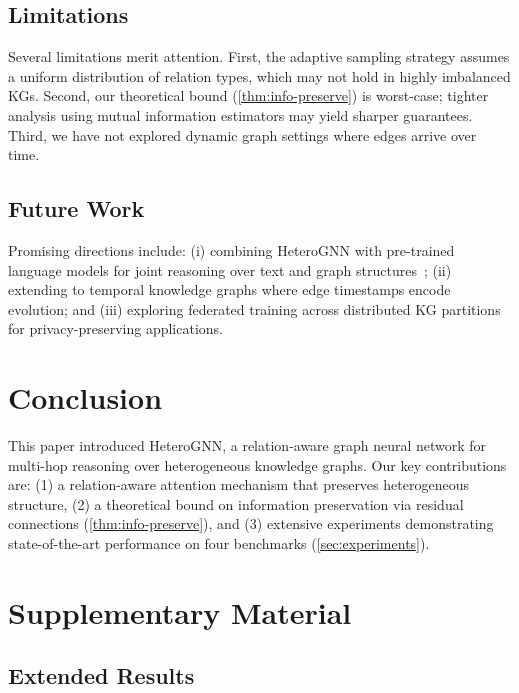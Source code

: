 \documentclass[
    language=english,
    doctype=article,
    institution=none,
]{../../omnilatex}
\theoremstyle{definition}
\theoremstyle{definition}
\theoremstyle{remark}
\begin{document}
\subsection{Limitations}

Several limitations merit attention.  First, the adaptive sampling
strategy assumes a uniform distribution of relation types, which may not
hold in highly imbalanced KGs.  Second, our theoretical bound
(\cref{thm:info-preserve}) is worst-case; tighter analysis using mutual
information estimators may yield sharper guarantees.  Third, we have not
explored dynamic graph settings where edges arrive over time.

\subsection{Future Work}

Promising directions include: (i) combining HeteroGNN with pre-trained
language models for joint reasoning over text and graph
structures~\cite{mollenhauerHandbuchDieselmotoren2007};
(ii) extending to temporal knowledge graphs where edge timestamps
encode evolution; and (iii) exploring federated training across
distributed KG partitions for privacy-preserving applications.

\section{Conclusion}
\label{sec:conclusion}

This paper introduced HeteroGNN, a relation-aware graph neural network
for multi-hop reasoning over heterogeneous knowledge graphs.  Our key
contributions are: (1) a relation-aware attention mechanism that preserves
heterogeneous structure, (2) a theoretical bound on information
preservation via residual connections (\cref{thm:info-preserve}), and
(3) extensive experiments demonstrating state-of-the-art performance on
four benchmarks (\cref{sec:experiments}).

\section{Supplementary Material}
\label{sec:supplementary}

\subsection{Extended Results}
\end{document}
